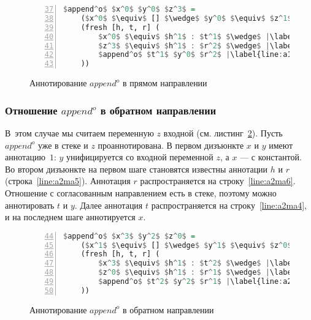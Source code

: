 \documentclass[conference,a4paper,american,russian]{IEEEtran}
\begin{document}
\begin{figure}[h!]
  \begin{center}
  \begin{minipage}{0.31\textwidth}
  \begin{lstlisting}[language=Haskell, frame=single, numbers=left,numberstyle=\small, firstnumber=37, escapechar=|]
  $append^o$ $x^0$ $y^0$ $z^3$ =
    ($x^0$ $\equiv$ [] $\wedge$ $y^0$ $\equiv$ $z^1$) $\vee$ |\label{line:a1ma2}|
    (fresh [h, t, r] (
        $x^0$ $\equiv$ $h^1$ : $t^1$ $\wedge$ |\label{line:a1ma4}|
        $z^3$ $\equiv$ $h^1$ : $r^2$ $\wedge$ |\label{line:a1ma5}|
        $append^o$ $t^1$ $y^0$ $r^2$ |\label{line:a1ma6}|
    ))
    \end{lstlisting}
  \end{minipage}
  \end{center}
  \caption{Аннотирование $append^o$ в прямом направлении}
  \label{lst:appendoANN1}
\end{figure}

\subsubsection{Отношение $append^o$ в обратном направлении}

В~этом случае мы считаем переменную $z$ входной (см. листинг~\ref{lst:appendoANN2}).
Пусть $append^o$ уже в стеке и $z$ проаннотирована.
В первом дизъюнкте $x$ и $y$ имеют аннотацию~$1$: $y$ унифицируется со входной переменной $z$, а $x$ --- с константой.
Во втором дизъюнкте на первом шаге становятся известны аннотации $h$ и $r$ (строка~\ref{line:a2ma5}).
Аннотация $r$ распространяется на строку~\ref{line:a2ma6}. 
Отношение с согласованным направлением есть в стеке, поэтому можно аннотировать $t$ и $y$.
Далее аннотация $t$ распространяется на строку~\ref{line:a2ma4}, и на последнем шаге аннотируется $x$. 

\begin{figure}[h!]
  \begin{center}
  \begin{minipage}{0.3\textwidth}
  \begin{lstlisting}[language=Haskell, frame=single, numbers=left,numberstyle=\small, firstnumber=44, escapechar=|]
  $append^o$ $x^3$ $y^2$ $z^0$ =
    ($x^1$ $\equiv$ [] $\wedge$ $y^1$ $\equiv$ $z^0$) $\vee$ |\label{line:a2ma2}|
    (fresh [h, t, r] (
        $x^3$ $\equiv$ $h^1$ : $t^2$ $\wedge$ |\label{line:a2ma4}|
        $z^0$ $\equiv$ $h^1$ : $r^1$ $\wedge$ |\label{line:a2ma5}|
        $append^o$ $t^2$ $y^2$ $r^1$ |\label{line:a2ma6}|
    ))
    \end{lstlisting}
  \end{minipage}
  \end{center}
  \caption{Аннотирование $append^o$ в обратном направлении}
  \label{lst:appendoANN2}
\end{figure}
\end{document}
